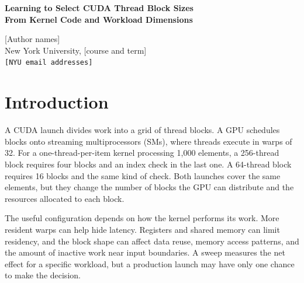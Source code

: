 \documentclass[11pt,letterpaper]{article}
\begin{document}
\begin{center}
{\Large\bfseries Learning to Select CUDA Thread Block Sizes\\From Kernel Code and Workload Dimensions\par}
\vspace{4pt}
[Author names]\\
New York University, [course and term]\\
{\small\texttt{[NYU email addresses]}}
\end{center}

\begin{abstract}
Choosing a CUDA thread-block size affects kernel runtime, and benchmarking every candidate incurs a tuning
cost. Starting from the published LS-CAT predictor, we ask how much LLVM IR information a launch selector
needs to retain. Our model learns gates over LSTM states, caches the surviving states at build time, and
uses workload dimensions to score candidate sizes at runtime. A 12-kernel pilot collapsed to one retained
state by epoch 10. On 2,785 held-out LS-CAT cases, adaptive retention pruned 16.7\% of optional gates and
achieved 5.54\% mean runtime regret at its selected epoch, compared with 5.48\% for the full-sequence model.
Across 13 live cases, toolcall achieved 1.05--1.50\ensuremath{\times} speedup over fixed 256-thread blocks
with selection time included.
\end{abstract}

\section{Introduction}

A CUDA launch divides work into a grid of thread blocks. A GPU schedules blocks onto streaming
multiprocessors (SMs), where threads execute in warps of 32. For a one-thread-per-item kernel processing
1,000 elements, a 256-thread block requires four blocks and an index check in the last one. A 64-thread
block requires 16 blocks and the same kind of check. Both launches cover the same elements, but they change
the number of blocks the GPU can distribute and the resources allocated to each block.

The useful configuration depends on how the kernel performs its work. More resident warps can help hide
latency. Registers and shared memory can limit residency, and the block shape can affect data reuse, memory
access patterns, and the amount of inactive work near input boundaries. A sweep measures the net effect for
a specific workload, but a production launch may have only one chance to make the decision.
\end{document}
